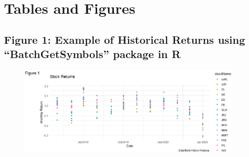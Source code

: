 \documentclass[12pt,english]{article}
\begin{document}
    \newpage
    \section{Tables and Figures}
        \subsection{Figure 1: Example of Historical Returns using “BatchGetSymbols” package in R}
            \begin{figure}
                \begin{center}
                    \includegraphics{FinalProject_Carpenter.eps}
                \end{center}
            \end{figure}
            
\end{document}
